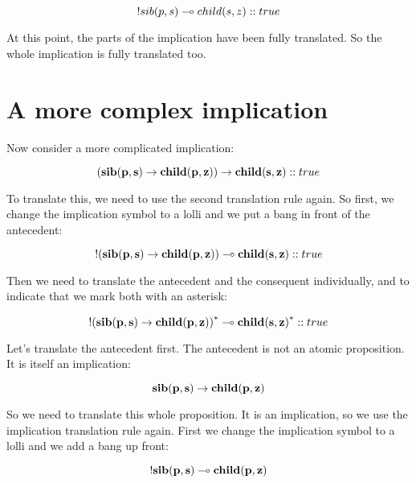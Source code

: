 \documentclass[../../../main.tex]{subfiles}
\begin{document}
\begin{equation*}
  \bang/sib(p, s) \lolli/ child(s, z) :: true
\end{equation*}

\noindent
At this point, the parts of the implication have been fully translated. So the whole implication is fully translated too.


\section{A more complex implication}

Now consider a more complicated implication:

\begin{equation*}
  \nd{(sib(p, s) \impl/ child(p, z)) \impl/ child(s, z)} :: true
\end{equation*}

\noindent
To translate this, we need to use the second translation rule again. So first, we change the implication symbol to a lolli and we put a bang in front of the antecedent:

\begin{equation*}
  \nd{\bang/(sib(p, s) \impl/ child(p, z)) \lolli/ child(s, z)} :: true
\end{equation*}

\noindent
Then we need to translate the antecedent and the consequent individually, and to indicate that we mark both with an asterisk:

\begin{equation*}
  \nd{\bang/(sib(p, s) \impl/ child(p, z))}^{*} \lolli/ \nd{child(s, z)}^{*} :: true
\end{equation*}

\noindent
Let's translate the antecedent first. The antecedent is not an atomic proposition. It is itself an implication:

\begin{equation*}
  \nd{sib(p, s) \impl/ child(p, z)}
\end{equation*}

\noindent
So we need to translate this whole proposition. It is an implication, so we use the implication translation rule again. First we change the implication symbol to a lolli and we add a bang up front:

\begin{equation*}
  \bang/\nd{sib(p, s)} \lolli/ \nd{child(p, z)}
\end{equation*}
\end{document}
